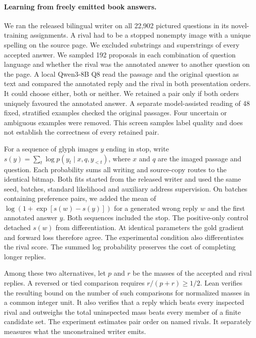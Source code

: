 \paragraph{Learning from freely emitted book answers.}
We ran the released bilingual writer on all 22,902 pictured questions in its novel-training assignments. A rival had to be a stopped nonempty image with a unique spelling on the source page. We excluded substrings and superstrings of every accepted answer. We sampled 192 proposals in each combination of question language and whether the rival was the annotated answer to another question on the page. A local Qwen3-8B Q8 read the passage and the original question as text and compared the annotated reply and the rival in both presentation orders. It could choose either, both or neither. We retained a pair only if both orders uniquely favoured the annotated answer. A separate model-assisted reading of 48 fixed, stratified examples checked the original passages. Four uncertain or ambiguous examples were removed. This screen samples label quality and does not establish the correctness of every retained pair.

For a sequence of glyph images $y$ ending in stop, write $s(y)=\sum_t\log p(y_t\mid x,q,y_{<t})$, where $x$ and $q$ are the imaged passage and question. Each probability sums all writing and source-copy routes to the identical bitmap. Both fits started from the released writer and used the same seed, batches, standard likelihood and auxiliary address supervision. On batches containing preference pairs, we added the mean of $\log(1+\exp[s(w)-s(y)])$ for a generated wrong reply $w$ and the first annotated answer $y$. Both sequences included the stop. The positive-only control detached $s(w)$ from differentiation. At identical parameters the gold gradient and forward loss therefore agree. The experimental condition also differentiates the rival score. The summed log probability preserves the cost of completing longer replies.

Among these two alternatives, let $p$ and $r$ be the masses of the accepted and rival replies. A reversed or tied comparison requires $r/(p+r)\geq 1/2$. Lean verifies the resulting bound on the number of such comparisons for normalized masses in a common integer unit. It also verifies that a reply which beats every inspected rival and outweighs the total uninspected mass beats every member of a finite candidate set. The experiment estimates pair order on named rivals. It separately measures what the unconstrained writer emits.

